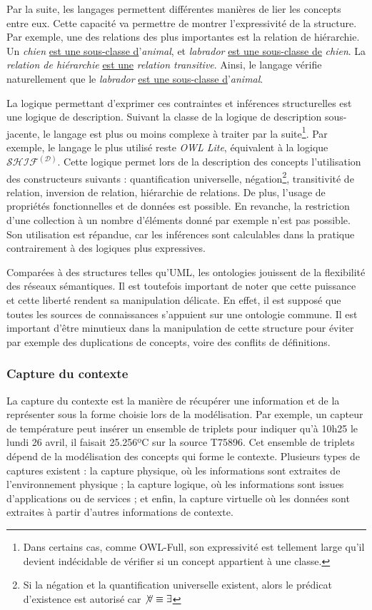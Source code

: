 Par la suite, les langages permettent différentes manières de lier les concepts entre eux. Cette capacité va permettre de montrer l'expressivité de la structure. Par exemple, une des relations des plus importantes est la relation de hiérarchie. Un \textit{chien} \underline{est une sous-classe d}'\textit{animal}, et \textit{labrador} \underline{est une sous-classe de} \textit{chien}. La \textit{relation de hiérarchie} \underline{est une} \textit{relation transitive}. Ainsi, le langage vérifie naturellement que le \textit{labrador} \underline{est une sous-classe d}'\textit{animal}. 

La logique permettant d'exprimer ces contraintes et inférences structurelles est une logique de description. Suivant la classe de la logique de description sous-jacente, le langage est plus ou moins complexe à traiter par la suite\footnote{Dans certains cas, comme OWL-Full, son expressivité est tellement large qu'il devient indécidable de vérifier si un concept appartient à une classe.}. Par exemple, le langage le plus utilisé reste \textit{OWL Lite}, équivalent à la logique $\mathcal{SHIF}^\mathcal{(D)}$. Cette logique permet lors de la description des concepts l'utilisation des constructeurs suivants : quantification universelle, négation\footnote{Si la négation et la quantification universelle existent, alors le prédicat d'existence est autorisé car $\not\forall \equiv \exists$}, transitivité de relation, inversion de relation, hiérarchie de relations. De plus, l'usage de propriétés fonctionnelles et de données est possible. En revanche, la restriction d'une collection à un nombre d'éléments donné par exemple n'est pas possible. Son utilisation est répandue, car les inférences sont calculables dans la pratique contrairement à des logiques plus expressives.

Comparées à des structures telles qu'UML, les ontologies jouissent de la flexibilité des réseaux sémantiques. Il est toutefois important de noter que cette puissance et cette liberté rendent sa manipulation délicate. En effet, il est supposé que toutes les sources de connaissances s'appuient sur une ontologie commune. Il est important d'être minutieux dans la manipulation de cette structure pour éviter par exemple des duplications de concepts, voire des conflits de définitions.

\subsubsection{Capture du contexte}
La capture du contexte est la manière de récupérer une information et de la représenter sous la forme choisie lors de la modélisation. Par exemple, un capteur de température peut insérer un ensemble de triplets pour indiquer qu'à 10h25 le lundi 26 avril, il faisait 25.256ºC sur la source T75896. Cet ensemble de triplets dépend de la modélisation des concepts qui forme le contexte. Plusieurs types de captures existent : la capture physique, où les informations sont extraites de l'environnement physique ; la capture logique, où les informations sont issues d'applications ou de services ; et enfin, la capture virtuelle où les données sont extraites à partir d'autres informations de contexte.

